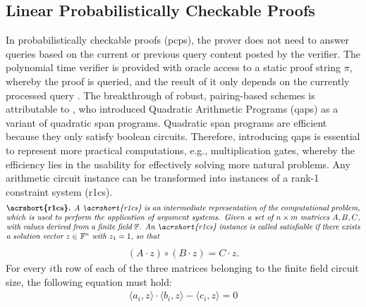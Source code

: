 \subsection{Linear Probabilistically Checkable Proofs}
In probabilistically checkable proofs (\acrshort{pcp}s), the prover does not need to answer queries based on the current or previous query content posted by the verifier. The polynomial time verifier is provided with oracle access to a static proof string \begin{math} \pi \end{math}, whereby the proof is queried, and the result of it only depends on the currently processed query \citep{PCP}. The breakthrough of robust, pairing-based schemes is attributable to \citet{GennaroLinPCP}, who introduced Quadratic Arithmetic Programs (\acrshort{qap}s) as a variant of quadratic span programs. Quadratic span programs are efficient because they only satisfy boolean circuits. Therefore, introducing \acrshort{qap}s is essential to represent more practical computations, e.g., multiplication gates, whereby the efficiency lies in the usability for effectively solving more natural problems. Any arithmetic circuit instance can be transformed into instances of a rank-1 constraint system (\acrshort{r1cs}).
\begin{align*}
    \text{\parbox{450pt}{\textbf{\acrshort{r1cs}.} \textit{A \acrshort{r1cs} is an intermediate representation of the computational problem, which is used to perform the application of argument systems. Given a set of \(n \times m \text{ matrices} \ A, B, C\), with values derived from a finite field \begin{math} \mathbb{F} \end{math}. An \acrshort{r1cs} instance is called satisfiable if there exists a solution vector \(z \in\) \begin{math} \mathbb{F}^n \end{math} with \(z_1 = 1\), so that}}}
\end{align*}
\begin{align*}
    (A \cdot z) \circ (B \cdot z) = C \cdot z.
\end{align*}
For every \(i\)th row of each of the three matrices belonging to the finite field circuit size, the following equation must hold:
\begin{align}
    \langle a_i, z \rangle \cdot \langle b_i, z \rangle - \langle c_i, z\rangle = 0 
\end{align}


